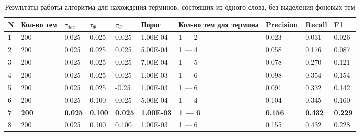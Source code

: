 \documentclass[a4paper, 12pt]{article}
\begin{document}
    \begin{table}[!ht]
    \caption{Результаты работы алгоритма для нахождения терминов, состоящих из одного слова, без выделения фоновых тем}
    \label{table:Res_1}
    \centering\medskip
    \begin{tabular}{|l|p{40 pt}|l|l|l|l|p{50 pt}|l|l|l|}
    \hline
        N & Кол-во тем & $\tau_{dec}$ & $\tau_{\Phi}$ & $\tau_{\Theta}$ & Порог & Кол-во тем для термина & Precision & Recall & F1 \\ \hline
        1 & 200 & 0.025 & 0.025 & 0.025 & 1.00E-04 & 1 — 2 & 0.023 & 0.031 & 0.026 \\ \hline
        2 & 200 & 0.025 & 0.025 & 0.025 & 5.00E-04 & 1 — 4 & 0.058 & 0.176 & 0.087 \\ \hline
        3 & 200 & 0.025 & 0.025 & 0.025 & 7.00E-04 & 1 — 5 & 0.078 & 0.270 & 0.121 \\ \hline
        4 & 200 & 0.025 & 0.025 & 0.025 & 1.00E-03 & 1 — 6 & 0.098 & 0.354 & 0.154 \\ \hline
        5 & 200 & 0.025 & 0.025 & -0.25 & 1.00E-03 & 1 — 6 & 0.091 & 0.332 & 0.142 \\ \hline
        6 & 200 & 0.025 & 0.100 & 0.025 & 5.00E-04 & 1 — 4 & 0.104 & 0.345 & 0.160 \\ \hline
        \textbf{7} & \textbf{200} & \textbf{0.025} & \textbf{0.100} & \textbf{0.025} & \textbf{1.00E-03} & \textbf{1 — 6} & \textbf{0.156} & \textbf{0.432} & \textbf{0.229} \\ \hline
        8 & 200 & 0.025 & 0.100 & 0.100 & 1.00E-03 & 1 — 6 & 0.155 & 0.432 & 0.228 \\ \hline

    \end{tabular}
\end{table}
\end{document}
